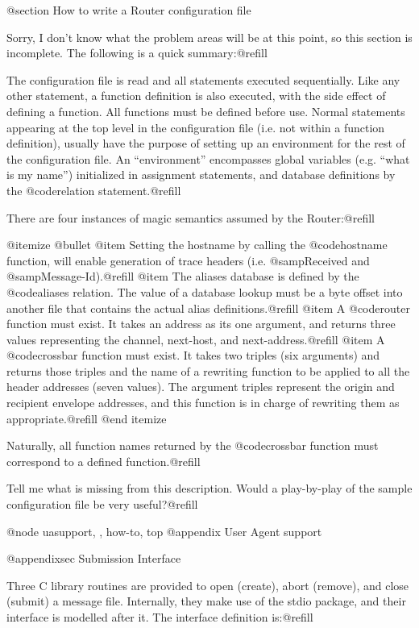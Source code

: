 {{@section How to write a Router configuration file

Sorry, I don't know what the problem areas will be at this point, so this
section is incomplete.  The following is a quick summary:@refill

The configuration file is read and all statements executed sequentially.
Like any other statement, a function definition is also executed, with the
side effect of defining a function.  All functions must be defined before
use.  Normal statements appearing at the top level in the configuration file
(i.e. not within a function definition), usually have the purpose of setting
up an environment for the rest of the configuration file.  An ``environment''
encompasses global variables (e.g. ``what is my name'') initialized in
assignment statements, and database definitions by the @code{relation}
statement.@refill

There are four instances of magic semantics assumed by the Router:@refill

@itemize @bullet
@item
Setting the hostname by calling the @code{hostname} function, will enable
generation of trace headers (i.e. @samp{Received} and
@samp{Message-Id}).@refill
@item
The aliases database is defined by the @code{aliases} relation.  The value of
a database lookup must be a byte offset into another file that contains the
actual alias definitions.@refill
@item
A @code{router} function must exist.  It takes an address as its one
argument, and returns three values representing the channel, next-host, and
next-address.@refill
@item
A @code{crossbar} function must exist.  It takes two triples (six arguments)
and returns those triples and the name of a rewriting function to be applied
to all the header addresses (seven values).  The argument triples represent
the origin and recipient envelope addresses, and this function is in charge
of rewriting them as appropriate.@refill
@end itemize

Naturally, all function names returned by the @code{crossbar} function must
correspond to a defined function.@refill

Tell me what is missing from this description.  Would a play-by-play of the
sample configuration file be very useful?@refill

@node uasupport, , how-to, top
@appendix User Agent support

@appendixsec Submission Interface

Three C library routines are provided to open (create), abort (remove), and
close (submit) a message file.  Internally, they make use of the stdio package,
and their interface is modelled after it.  The interface definition is:@refill

}}
